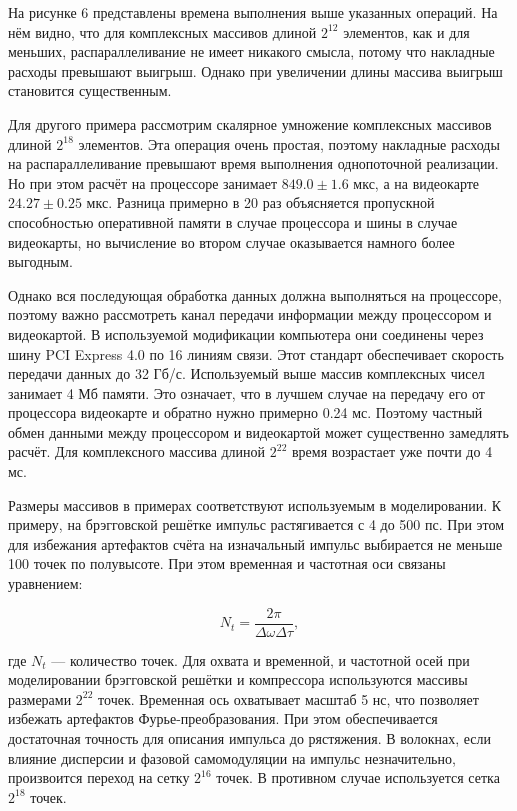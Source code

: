 \documentclass[12pt]{article}
\begin{document}
На рисунке 6 представлены времена выполнения выше указанных операций. На нём видно, что для комплексных массивов
длиной $2^{12}$ элементов, как и для меньших, распараллеливание не имеет никакого смысла, потому что накладные
расходы превышают выигрыш. Однако при увеличении длины массива выигрыш становится существенным.

Для другого примера рассмотрим скалярное умножение комплексных массивов длиной $2^{18}$ элементов. Эта операция
очень простая, поэтому накладные расходы на распараллеливание превышают время выполнения однопоточной реализации.
Но при этом расчёт на процессоре занимает $849.0 \pm 1.6$ мкс, а на видеокарте $24.27 \pm 0.25$ мкс. Разница примерно
в 20 раз объясняется пропускной способностью оперативной памяти в случае процессора и шины в случае видеокарты,
но вычисление во втором случае оказывается намного более выгодным.

Однако вся последующая обработка данных должна выполняться на процессоре, поэтому важно рассмотреть канал передачи
информации между процессором и видеокартой. В используемой модификации компьютера они соединены через шину PCI
Express 4.0 по 16 линиям связи. Этот стандарт обеспечивает скорость передачи данных до 32 Гб/с. Используемый выше
массив комплексных чисел занимает 4 Мб памяти. Это означает, что в лучшем случае на передачу его от процессора
видеокарте и обратно нужно примерно 0.24 мс. Поэтому частный обмен данными между процессором и видеокартой может
существенно замедлять расчёт. Для комплексного массива длиной $2^{22}$ время возрастает уже почти до 4 мс.

Размеры массивов в примерах соответствуют используемым в моделировании. К примеру, на брэгговской решётке импульс
растягивается с 4 до 500 пс. При этом для избежания артефактов счёта на изначальный импульс выбирается не меньше
100 точек по полувысоте. При этом временная и частотная оси связаны уравнением:

\begin{equation}
    N_t = \frac{2\pi}{\Delta \omega \Delta \tau},
\end{equation}

где $N_t$ — количество точек. Для охвата и временной, и частотной осей при моделировании брэгговской решётки и
компрессора используются массивы размерами $2^{22}$ точек. Временная ось охватывает масштаб 5 нс, что позволяет избежать
артефактов Фурье-преобразования. При этом обеспечивается достаточная точность для описания импульса до рястяжения.
В волокнах, если влияние дисперсии и фазовой самомодуляции на импульс незначительно, произвоится переход на сетку
$2^{16}$ точек. В противном случае используется сетка $2^{18}$ точек.
\end{document}
